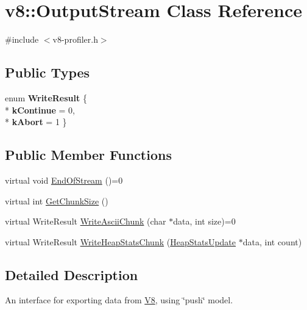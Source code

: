 \hypertarget{classv8_1_1_output_stream}{}\section{v8\+:\+:Output\+Stream Class Reference}
\label{classv8_1_1_output_stream}


{\ttfamily \#include $<$v8-\/profiler.\+h$>$}

\subsection*{Public Types}
\begin{DoxyCompactItemize}
\item 
enum {\bfseries Write\+Result} \{ \\*
{\bfseries k\+Continue} = 0, 
\\*
{\bfseries k\+Abort} = 1
 \}\hypertarget{classv8_1_1_output_stream_a336c7605a0ce4fbe6f6fca3b03bc16de}{}\label{classv8_1_1_output_stream_a336c7605a0ce4fbe6f6fca3b03bc16de}

\end{DoxyCompactItemize}
\subsection*{Public Member Functions}
\begin{DoxyCompactItemize}
\item 
virtual void \hyperlink{classv8_1_1_output_stream_a6c5c308367fc5776bcbedff0e94d6049}{End\+Of\+Stream} ()=0
\item 
virtual int \hyperlink{classv8_1_1_output_stream_a93bdaa790cbd66a7283fad2cca3f48f7}{Get\+Chunk\+Size} ()
\item 
virtual Write\+Result \hyperlink{classv8_1_1_output_stream_a42adc62ebe43d00159f80328538f217f}{Write\+Ascii\+Chunk} (char $\ast$data, int size)=0
\item 
virtual Write\+Result \hyperlink{classv8_1_1_output_stream_a104fd1a0b5ef685e1d4967aaacbb9e9d}{Write\+Heap\+Stats\+Chunk} (\hyperlink{structv8_1_1_heap_stats_update}{Heap\+Stats\+Update} $\ast$data, int count)
\end{DoxyCompactItemize}


\subsection{Detailed Description}
An interface for exporting data from \hyperlink{classv8_1_1_v8}{V8}, using \char`\"{}push\char`\"{} model. 

